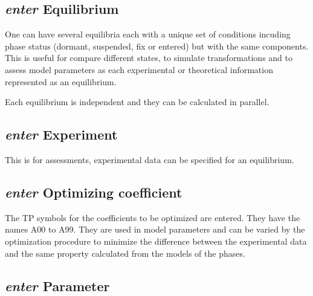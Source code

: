 \documentclass[12pt]{article}
\begin{document}
\subsection{{\em enter} Equilibrium}

One can have several equilibria each with a unique set of conditions
incuding phase status (dormant, suspended, fix or entered) but with
the same components.  This is useful for compare different states, to
simulate transformations and to assess model parameters as each
experimental or theoretical information represented as an equilibrium.

Each equilibrium is independent and they can be calculated in
parallel.

\subsection{{\em enter} Experiment}

This is for assessments, experimental data can be specified for an
equilibrium.

\subsection{{\em enter} Optimizing coefficient}

The TP symbols for the coefficients to be optimized are entered.  They
have the names A00 to A99.  They are used in model parameters and can
be varied by the optimization procedure to minimize the difference
between the experimental data and the same property calculated from
the models of the phases.

\subsection{{\em enter} Parameter}
\end{document}
